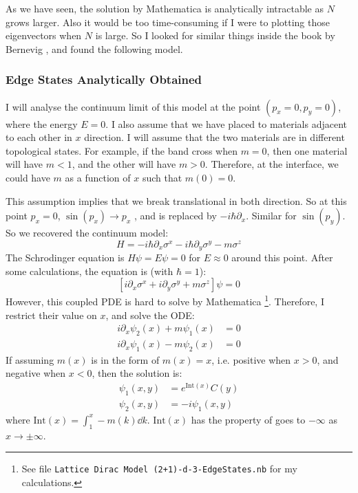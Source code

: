 \documentclass{article}
\begin{document}
As we have seen, the solution by Mathematica is analytically
intractable as $N$ grows larger. Also it would be too time-consuming
if I were to plotting those eigenvectors when $N$ is large. So I
looked for similar things inside the book by Bernevig
\cite{Bernevig2013}, and found the following model.

    \subsubsection{Edge States Analytically Obtained}
    \label{sec:Edge States}
    I will analyse the continuum limit of this model at the point
    $(p_x=0,p_y=0)$, where the energy $E=0$. I also assume that we
    have placed to materials adjacent to each other in $x$ direction.
    I will assume that the two materials are in different topological
    states. For example, if the band cross when $m=0$, then one
    material will have $m<1$, and the other will have $m>0$.
    Therefore, at the interface, we could have $m$ as a function of
    $x$ such that $m(0)=0$.

    This assumption implies that we break translational in both
    direction. So at this point $p_x=0$, $\sin(p_x)\to p_x$ , and is
    replaced by $-i\hbar \partial _x$. Similar for $\sin(p_y)$. So we
    recovered the continuum model:
    \begin{equation}
        H = -i\hbar\partial_x \sigma^x 
        -i\hbar\partial_y \sigma^y -m \sigma^z
    \end{equation}
    The Schrodinger equation is $H\psi =E\psi = 0$ for $E\approx 0$
    around this point. After some calculations, the equation is (with
    $\hbar=1$):
    \begin{equation}
        \left[i\partial_x \sigma^x + i\partial_y \sigma^y +
        m\sigma^z\right] \psi = 0
    \end{equation}
    However, this coupled PDE is hard to solve by Mathematica
    \footnote{See file \texttt{Lattice Dirac Model
    (2+1)-d-3-EdgeStates.nb} for my calculations.}. Therefore, I
    restrict their value on $x$, and solve the ODE:
    \begin{align}
        i\partial_x \psi_2(x) + m\psi_1(x) &= 0 \\
        i\partial_x \psi_1(x) - m\psi_2(x) &= 0
    \end{align}
    If assuming $m(x)$ is in the form of $m(x)=x$, i.e. positive when
    $x>0$, and negative when $x<0$, then the solution is:
    \begin{align}
        \psi_1 (x,y) &= e^{\text{Int}(x)} C(y) \\
        \psi_2 (x,y) &= -i \psi_1(x,y)
    \end{align}
    where $\text{Int}(x)=\int_1^x -m(k)\dd{k}$. $\text{Int}(x)$ has the
    property of goes to $-\infty$ as $x\to \pm\infty$.
\end{document}
